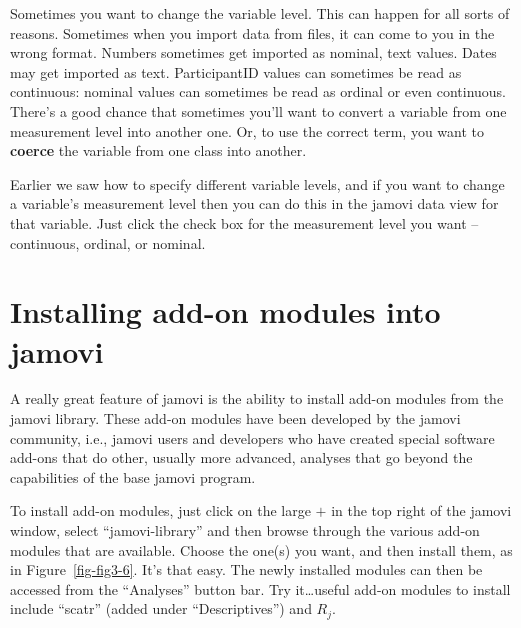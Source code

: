 \documentclass[
  a4paper,
]{book}
\begin{document}
Sometimes you want to change the variable level. This can happen for all
sorts of reasons. Sometimes when you import data from files, it can come
to you in the wrong format. Numbers sometimes get imported as nominal,
text values. Dates may get imported as text. ParticipantID values can
sometimes be read as continuous: nominal values can sometimes be read as
ordinal or even continuous. There's a good chance that sometimes you'll
want to convert a variable from one measurement level into another one.
Or, to use the correct term, you want to \textbf{coerce} the variable
from one class into another.

Earlier we saw how to specify different variable levels, and if you want
to change a variable's measurement level then you can do this in the
jamovi data view for that variable. Just click the check box for the
measurement level you want -- continuous, ordinal, or nominal.

\hypertarget{installing-add-on-modules-into-jamovi}{%
\section{Installing add-on modules into
jamovi}\label{installing-add-on-modules-into-jamovi}}

A really great feature of jamovi is the ability to install add-on
modules from the jamovi library. These add-on modules have been
developed by the jamovi community, i.e., jamovi users and developers who
have created special software add-ons that do other, usually more
advanced, analyses that go beyond the capabilities of the base jamovi
program.

To install add-on modules, just click on the large \(+\) in the top
right of the jamovi window, select ``jamovi-library'' and then browse
through the various add-on modules that are available. Choose the one(s)
you want, and then install them, as in Figure~\ref{fig-fig3-6}. It's
that easy. The newly installed modules can then be accessed from the
``Analyses'' button bar. Try it\ldots useful add-on modules to install
include ``scatr'' (added under ``Descriptives'') and \(R_j\).
\end{document}
